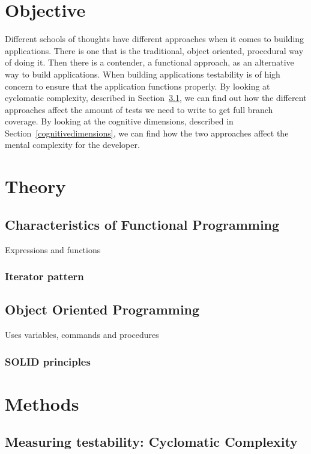 \documentclass[12pt]{article}
\theoremstyle{definition}
\theoremstyle{theorem}
\begin{document}
\section{Objective}

Different schools of thoughts have different approaches when it comes to
building applications. There is one that is the traditional, object oriented,
procedural way of doing it. Then there is a contender, a functional approach, as
an alternative way to build applications. When building applications testability
is of high concern to ensure that the application functions properly. By looking
at cyclomatic complexity, described in Section~\ref{cyclomaticcomplexity}, we
can find out how the different approaches affect the amount of tests we need to
write to get full branch coverage. By looking at the cognitive dimensions,
described in Section~\ref{cognitivedimensions}, we can find how the two
approaches affect the mental complexity for the developer. 


\section{Theory}\label{theory}

\subsection{Characteristics of Functional Programming}
Expressions and functions

\subsubsection{Iterator pattern}

\subsection{Object Oriented Programming}\label{oop}
Uses variables, commands and procedures

\subsubsection{SOLID principles}

\section{Methods}\label{methods}

\subsection{Measuring testability: Cyclomatic Complexity}\label{cyclomaticcomplexity}
\end{document}
